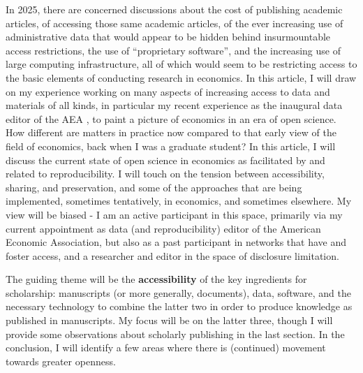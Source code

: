 \documentclass{Revue-economique}
\newcommand{\citep}{\parencite}
\begin{document}
\begin{Article} [%
	Titre={Reproducibility and Open Science in Economics},
	Auteur={Lars Vilhuber\thanks{Cornell University, lars.vilhuber@cornell.edu}}]
\begin{refsection}[Main]
In 2025, there are concerned discussions about the cost of publishing academic articles, of accessing those same academic articles, of the ever increasing use of administrative data \citep{card_expanding_2010,card_expanding_2010-1,chetty_time_2012,einav_economics_2014} that would appear to be hidden behind insurmountable access restrictions,  the use of ``proprietary software'', and the increasing use of large computing infrastructure, all of which would seem to be restricting access to the basic elements of conducting research in economics. In this article, I will draw on my experience working on many aspects of increasing access to data and materials of all kinds, in particular my recent experience as the inaugural data editor of the \ac{AEA} \citep{10.1257/pandp.108.745}, to paint a picture of economics in an era of open science. How different are matters in practice now compared to that early view of the field of economics, back when I was a graduate student?
%
In this article, I will discuss the current state of open science in economics as facilitated by and related to reproducibility. I will touch on the tension between accessibility, sharing, and preservation, and some of the approaches that are being implemented, sometimes tentatively, in economics, and sometimes elsewhere. My view will be biased - I am an active participant in this space, primarily via my current appointment as data (and reproducibility) editor of the American Economic Association, but also as a past participant in networks that have and foster access, and a researcher and editor in the space of disclosure limitation.

The guiding theme will be the \textbf{accessibility} of the key ingredients for scholarship: manuscripts (or more generally, documents), data, software, and the necessary technology to combine the latter two in order to produce knowledge as published in manuscripts. My focus will be on the latter three, though I will provide some observations about scholarly publishing in the last section.
In the conclusion, I will identify a few areas where there is (continued) movement towards greater openness. 




\end{refsection}
\end{Article}
\end{document}
